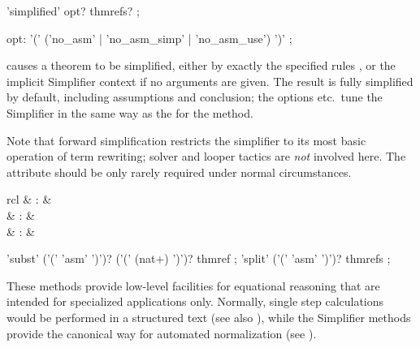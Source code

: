 \begin{isabellebody}
\begin{isamarkuptext}
  \begin{rail}
    'simplified' opt? thmrefs?
    ;

    opt: '(' ('no\_asm' | 'no\_asm\_simp' | 'no\_asm\_use') ')'
    ;
  \end{rail}

  \begin{descr}
  
  \item [\mbox{\isa{simplified}}~\isa{a\isactrlsub {\isadigit{1}}\ {\isasymdots}\ a\isactrlsub n}]
  causes a theorem to be simplified, either by exactly the specified
  rules , or the implicit Simplifier
  context if no arguments are given.  The result is fully simplified
  by default, including assumptions and conclusion; the options  etc.\ tune the Simplifier in the same way as the for the
   method.

  Note that forward simplification restricts the simplifier to its
  most basic operation of term rewriting; solver and looper tactics
  \cite{isabelle-ref} are \emph{not} involved here.  The  attribute should be only rarely required under normal
  circumstances.

  \end{descr}%
\end{isamarkuptext}%
\isamarkuptrue%
%
\isamarkuptrue%
%
\begin{isamarkuptext}%
\begin{matharray}{rcl}
    \mbox{}\isa{\isactrlsup {\isacharasterisk}} & : & \isarmeth \\
    \mbox{}\isa{\isactrlsup {\isacharasterisk}} & : & \isarmeth \\
    \mbox{}\isa{\isactrlsup {\isacharasterisk}} & : & \isarmeth \\
  \end{matharray}

  \begin{rail}
    'subst' ('(' 'asm' ')')? ('(' (nat+) ')')? thmref
    ;
    'split' ('(' 'asm' ')')? thmrefs
    ;
  \end{rail}

  These methods provide low-level facilities for equational reasoning
  that are intended for specialized applications only.  Normally,
  single step calculations would be performed in a structured text
  (see also ), while the Simplifier methods
  provide the canonical way for automated normalization (see
  ).


\end{isamarkuptext}
\end{isabellebody}
